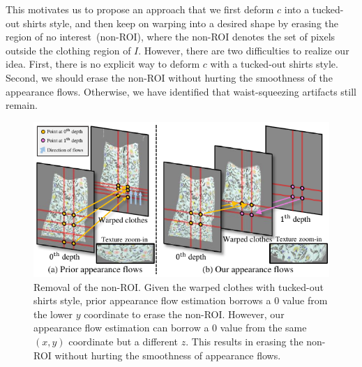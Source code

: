 \documentclass[letterpaper]{article} %
\begin{document}
This motivates us to propose an approach that we first deform $c$ into a tucked-out shirts style, and then keep on warping into a desired shape by erasing the region of no interest~(non-ROI), where the non-ROI denotes the set of pixels outside the clothing region of $I$.
However, there are two difficulties to realize our idea. First, there is no explicit way to deform $c$ with a tucked-out shirts style. Second, we should erase the non-ROI without hurting the smoothness of the appearance flows. Otherwise, we have identified that waist-squeezing artifacts still remain.

\begin{figure}[t]
    \centering
     \includegraphics[width=\linewidth]{fig/fig3.pdf}
     \caption{Removal of the non-ROI. Given the warped clothes with tucked-out shirts style, prior appearance flow estimation borrows a 0 value from the lower $y$ coordinate to erase the non-ROI. However, our appearance flow estimation can borrow a 0 value from the same $(x,y)$ coordinate but a different $z$. This results in erasing the non-ROI without hurting the smoothness of appearance flows.}
     \label{fig_4_temp}
\end{figure}
\end{document}

